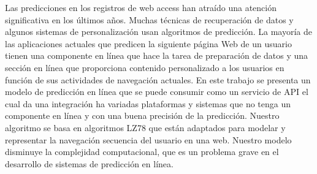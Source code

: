 {%
Las predicciones en los registros de web access han atraído una atención significativa en los últimos años. Muchas técnicas de recuperación de datos  y algunos sistemas de personalización usan algoritmos de predicción. La mayoría de las aplicaciones actuales que predicen la siguiente página Web de un usuario tienen una componente en línea que hace la tarea de preparación de datos y una sección en línea que proporciona contenido personalizado a los usuarios en función de sus actividades de navegación actuales. En este trabajo se presenta un modelo de predicción en línea que se puede consumir como un servicio de API el cual da una integración ha variadas plataformas y sistemas que no tenga un componente en línea y con una buena precisión de la predicción. 
Nuestro algoritmo se basa en algoritmos LZ78 que están adaptados para modelar  y representar la navegación secuencia del usuario en una web. Nuestro modelo disminuye la complejidad computacional, que es un problema grave en el desarrollo de sistemas de predicción en línea. 


  }








